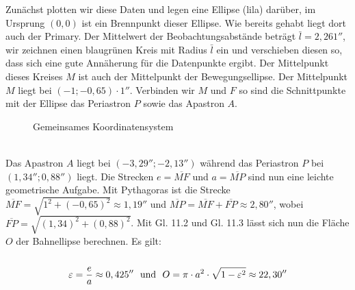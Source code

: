 \documentclass[12pt]{article}
\begin{document}
Zunächst plotten wir diese Daten und legen eine Ellipse (lila) darüber, im Ursprung $(0,0)$ ist ein Brennpunkt dieser Ellipse. Wie bereits gehabt liegt dort auch der Primary. Der Mittelwert der Beobachtungsabstände beträgt $\bar{l} = 2,261''$, wir zeichnen einen blaugrünen Kreis mit Radius $\bar{l}$ ein und verschieben diesen so, dass sich eine gute Annäherung für die Datenpunkte ergibt. Der Mittelpunkt dieses Kreises $M$ ist auch der Mittelpunkt der Bewegungsellipse.
Der Mittelpunkt $M$ liegt bei $(-1; -0,65)\cdot 1''$. Verbinden wir $M$ und $F$ so sind die Schnittpunkte mit der Ellipse das Periastron $P$ sowie das Apastron $A$.
\newpage\noindent
\begin{figure}[ht!]
    \centering
{}
\caption{Gemeinsames Koordinatensystem}
\end{figure}\\
Das Apastron $A$ liegt bei $(-3,29''; -2,13'')$ während das Periastron $P$ bei $(1,34''; 0,88'')$ liegt. Die Strecken $e=\overline{MF}$ und $a=\overline{MP}$ sind nun eine leichte geometrische Aufgabe. Mit Pythagoras ist die Strecke $\overline{MF}=\sqrt{1^2+(-0,65)^2} \approx 1,19''$ und $\overline{MP} = \overline{MF} + \overline{FP} \approx 2,80''$, wobei $\overline{FP}=\sqrt{(1,34)^2+(0,88)^2}$. Mit Gl. 11.2 und Gl. 11.3 lässt sich nun die Fläche $O$ der Bahnellipse berechnen. Es gilt:\\\\
\[\varepsilon = \frac{e}{a} \approx 0,425'' \ \ \textnormal{und} \ \ O=\pi\cdot a^2 \cdot \sqrt{1-\varepsilon^2} \approx 22,30''\]\\\\
\end{document}
